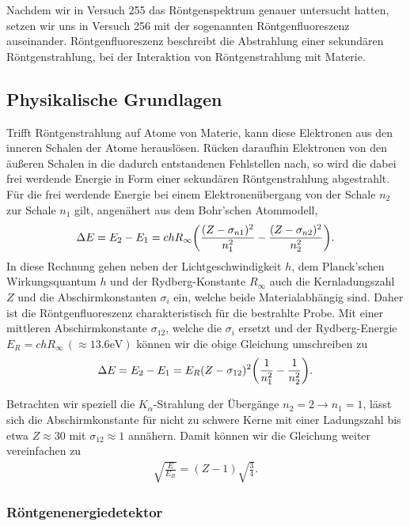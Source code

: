 Nachdem wir in Versuch 255 das Röntgenspektrum genauer untersucht hatten, setzen wir uns in Versuch 256 mit der sogenannten Röntgenfluoreszenz auseinander. Röntgenfluoreszenz beschreibt die Abstrahlung einer sekundären Röntgenstrahlung, bei der Interaktion von Röntgenstrahlung mit Materie.


\subsection{Physikalische Grundlagen}

Trifft Röntgenstrahlung auf Atome von Materie, kann diese Elektronen aus den inneren Schalen der Atome herauslösen. Rücken daraufhin Elektronen von den äußeren Schalen in die dadurch entstandenen Fehlstellen nach, so wird die dabei frei werdende Energie in Form einer sekundären Röntgenstrahlung abgestrahlt. Für die frei werdende Energie bei einem Elektronenübergang von der Schale $n_2$ zur Schale $n_1$ gilt, angenähert aus dem Bohr'schen Atommodell,
\begin{align}
  \Delta E = E_{2} - E_{1} = ch R_{\infty} \qty(\frac{(Z- \sigma_{n1})^2}{n_1^2} - \frac{(Z- \sigma_{n2})^2}{n_2^2}).
\end{align}
In diese Rechnung gehen neben der Lichtgeschwindigkeit $h$, dem Planck'schen Wirkungsquantum $h$ und der Rydberg-Konstante $R_{\infty}$ auch die Kernladungszahl $Z$ und die Abschirmkonstanten $\sigma_i$ ein, welche beide Materialabhängig sind. Daher ist die Röntgenfluoreszenz charakteristisch für die bestrahlte Probe. Mit einer mittleren Abschirmkonstante $\sigma_{12}$, welche die $\sigma_{i}$ ersetzt und der Rydberg-Energie $E_{R} = ch R_{\infty}\, (\approx 13.6\si{\electronvolt})$ können wir die obige Gleichung umschreiben zu
\begin{align}
  \Delta E = E_2 - E_1 = E_{R} (Z - \sigma_{12})^2 \qty(\frac{1}{n_1^2} - \frac{1}{n_2^2}).
\end{align}

Betrachten wir speziell die $K_{\alpha}$-Strahlung der Übergänge $n_{2} = 2\to n_{1} = 1$, lässt sich die Abschirmkonstante für nicht zu schwere Kerne mit einer Ladungszahl bis etwa $Z \approx 30$ mit $\sigma_{12} \approx 1$ annähern. Damit können wir die Gleichung weiter vereinfachen zu
\begin{align}
  \sqrt{\frac{E}{E_R}} = (Z - 1) \sqrt{\frac{3}{4}}.
\end{align}

\subsubsection*{Röntgenenergiedetektor}


